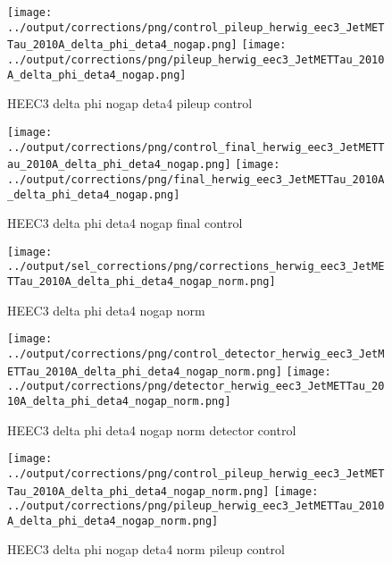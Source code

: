 \documentclass[11pt]{book}
\begin{document}
\begin{figure}[ht]
\centering
\texttt{[image: ../output/corrections/png/control\_pileup\_herwig\_eec3\_JetMETTau\_2010A\_delta\_phi\_deta4\_nogap.png]}
\texttt{[image: ../output/corrections/png/pileup\_herwig\_eec3\_JetMETTau\_2010A\_delta\_phi\_deta4\_nogap.png]}
\caption{HEEC3 delta phi nogap deta4 pileup control}
\label{fig:HEEC3_JetMETTau_2010A_delta_phi_deta4_nogap_pileup_control}
\end{figure}


\begin{figure}[ht]
\centering
\texttt{[image: ../output/corrections/png/control\_final\_herwig\_eec3\_JetMETTau\_2010A\_delta\_phi\_deta4\_nogap.png]}
\texttt{[image: ../output/corrections/png/final\_herwig\_eec3\_JetMETTau\_2010A\_delta\_phi\_deta4\_nogap.png]}
\caption{HEEC3 delta phi deta4 nogap final control}
\label{fig:HEEC3_JetMETTau_2010A_delta_phi_deta4_nogap_final_control}
\end{figure}

\begin{figure}[ht]
\centering
\texttt{[image: ../output/sel\_corrections/png/corrections\_herwig\_eec3\_JetMETTau\_2010A\_delta\_phi\_deta4\_nogap\_norm.png]}
\caption{HEEC3 delta phi deta4 nogap norm}
\label{fig:HEEC3_JetMETTau_2010A_delta_phi_deta4_nogap_norm}
\end{figure}

\begin{figure}[ht]
\centering
\texttt{[image: ../output/corrections/png/control\_detector\_herwig\_eec3\_JetMETTau\_2010A\_delta\_phi\_deta4\_nogap\_norm.png]}
\texttt{[image: ../output/corrections/png/detector\_herwig\_eec3\_JetMETTau\_2010A\_delta\_phi\_deta4\_nogap\_norm.png]}
\caption{HEEC3 delta phi deta4 nogap norm detector control}
\label{fig:HEEC3_JetMETTau_2010A_delta_phi_deta4_nogap_norm_detector_control}
\end{figure}

\begin{figure}[ht]
\centering
\texttt{[image: ../output/corrections/png/control\_pileup\_herwig\_eec3\_JetMETTau\_2010A\_delta\_phi\_deta4\_nogap\_norm.png]}
\texttt{[image: ../output/corrections/png/pileup\_herwig\_eec3\_JetMETTau\_2010A\_delta\_phi\_deta4\_nogap\_norm.png]}
\caption{HEEC3 delta phi nogap deta4 norm pileup control}
\label{fig:HEEC3_JetMETTau_2010A_delta_phi_deta4_nogap_norm_pileup_control}
\end{figure}
\end{document}
